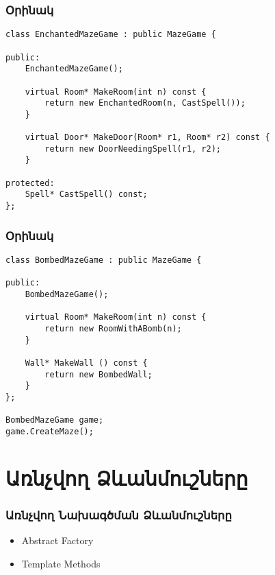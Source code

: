 \documentclass{beamer}
\begin{document}
\begin{frame}[fragile]\frametitle{Օրինակ}
\begin{english}
\begin{verbatim}
class EnchantedMazeGame : public MazeGame {

public:
    EnchantedMazeGame();

    virtual Room* MakeRoom(int n) const {
        return new EnchantedRoom(n, CastSpell());
    }

    virtual Door* MakeDoor(Room* r1, Room* r2) const {
        return new DoorNeedingSpell(r1, r2);
    }

protected:
    Spell* CastSpell() const;
};
\end{verbatim}
\end{english}
\end{frame}

\begin{frame}[fragile]\frametitle{Օրինակ}
\begin{english}
\begin{verbatim}
class BombedMazeGame : public MazeGame {

public:
    BombedMazeGame();

    virtual Room* MakeRoom(int n) const {
        return new RoomWithABomb(n);
    }

    Wall* MakeWall () const {
        return new BombedWall;
    }
};

BombedMazeGame game;
game.CreateMaze();
\end{verbatim}
\end{english}
\end{frame}

\section{Առնչվող Ձևանմուշները}
\begin{frame}\frametitle{Առնչվող Նախագծման Ձևանմուշները}
\begin{itemize}
    \item Abstract Factory \vfill
    \item Template Methods
\end{itemize}
\end{frame}
\end{document}
